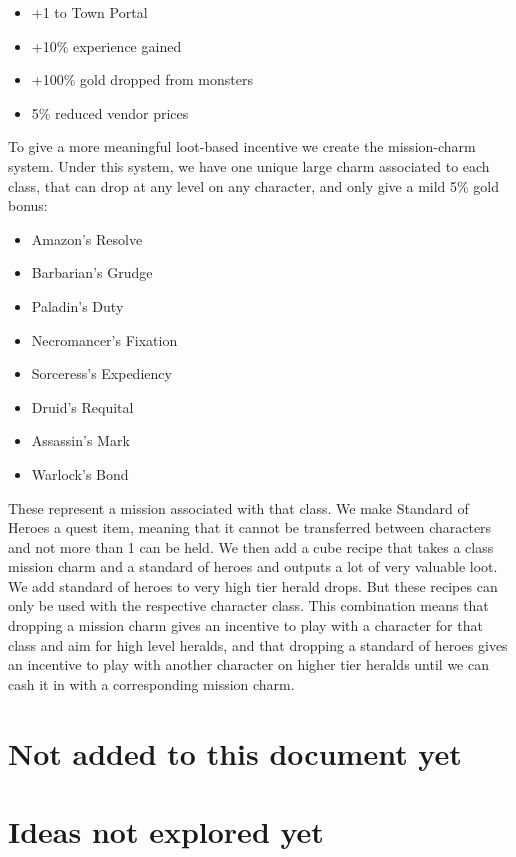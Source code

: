 \documentclass[12pt,a4paper]{article}
\begin{document}
\begin{itemize}
\item +1 to Town Portal
\item +10\% experience gained
\item +100\% gold dropped from monsters
\item 5\% reduced vendor prices
\end{itemize}

To give a more meaningful loot-based incentive we create the mission-charm system. Under this system, we have one unique large charm associated to each class, that can drop at any level on any character, and only give a mild 5\% gold bonus:
\begin{itemize}
\item Amazon's Resolve
\item Barbarian's Grudge
\item Paladin's Duty
\item Necromancer's Fixation
\item Sorceress's Expediency
\item Druid's Requital
\item Assassin's Mark
\item Warlock's Bond
\end{itemize}

These represent a mission associated with that class. We make Standard of Heroes a quest item, meaning that it cannot be transferred between characters and not more than 1 can be held. We then add a cube recipe that takes a class mission charm and a standard of heroes and outputs a lot of very valuable loot. We add standard of heroes to very high tier herald drops. But these recipes can only be used with the respective character class. This combination means that dropping a mission charm gives an incentive to play with a character for that class and aim for high level heralds, and that dropping a standard of heroes gives an incentive to play with another character on higher tier heralds until we can cash it in with a corresponding mission charm.

\section{Not added to this document yet}

\section{Ideas not explored yet}
\end{document}
